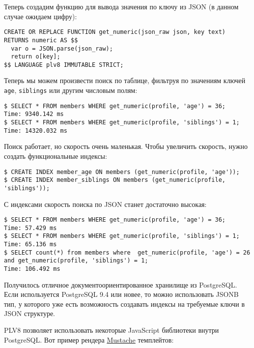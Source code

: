 Теперь создадим функцию для вывода значения по ключу из JSON (в данном случае ожидаем цифру):

\begin{lstlisting}[label=lst:plv8js11,caption=Функция для JSON]
CREATE OR REPLACE FUNCTION get_numeric(json_raw json, key text)
RETURNS numeric AS $$
  var o = JSON.parse(json_raw);
  return o[key];
$$ LANGUAGE plv8 IMMUTABLE STRICT;
\end{lstlisting}

Теперь мы можем произвести поиск по таблице, фильтруя по значениям ключей \lstinline!age!, \lstinline!siblings! или другим числовым полям:

\begin{lstlisting}[label=lst:plv8js12,caption=Поиск по данным JSON]
$ SELECT * FROM members WHERE get_numeric(profile, 'age') = 36;
Time: 9340.142 ms
$ SELECT * FROM members WHERE get_numeric(profile, 'siblings') = 1;
Time: 14320.032 ms
\end{lstlisting}

Поиск работает, но скорость очень маленькая. Чтобы увеличить скорость, нужно создать функциональные индексы:

\begin{lstlisting}[label=lst:plv8js13,caption=Создание индексов]
$ CREATE INDEX member_age ON members (get_numeric(profile, 'age'));
$ CREATE INDEX member_siblings ON members (get_numeric(profile, 'siblings'));
\end{lstlisting}

С индексами скорость поиска по JSON станет достаточно высокая:

\begin{lstlisting}[label=lst:plv8js14,caption=Поиск по данным JSON с индексами]
$ SELECT * FROM members WHERE get_numeric(profile, 'age') = 36;
Time: 57.429 ms
$ SELECT * FROM members WHERE get_numeric(profile, 'siblings') = 1;
Time: 65.136 ms
$ SELECT count(*) from members where  get_numeric(profile, 'age') = 26 and get_numeric(profile, 'siblings') = 1;
Time: 106.492 ms
\end{lstlisting}

Получилось отличное документоориентированное хранилище из PostgreSQL. Если используется PostgreSQL 9.4 или новее, то можно использовать JSONB тип, у которого уже есть возможность создавать индексы на требуемые ключи в JSON структуре.

PLV8 позволяет использовать некоторые JavaScript библиотеки внутри PostgreSQL. Вот пример рендера \href{http://mustache.github.com/}{Mustache} темплейтов:

